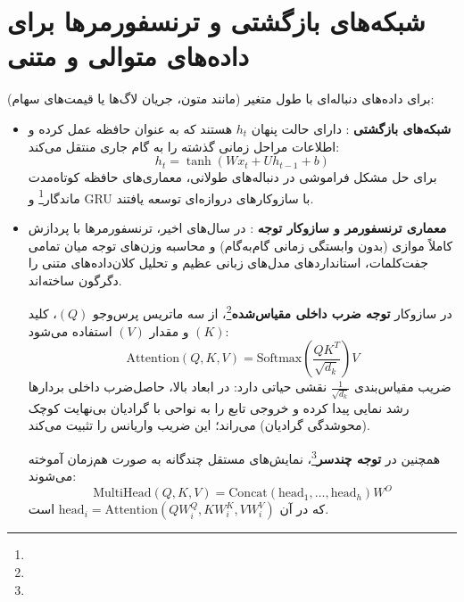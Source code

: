\section{شبکه‌های بازگشتی \texorpdfstring{}{(RNN)} و ترنسفورمرها برای داده‌های متوالی و متنی}
برای داده‌های دنباله‌ای با طول متغیر (مانند متون، جریان لاگ‌ها یا قیمت‌های سهام):
\begin{itemize}
    \item \textbf{شبکه‌های بازگشتی }: دارای حالت پنهان $h_t$ هستند که به عنوان حافظه عمل کرده و اطلاعات مراحل زمانی گذشته را به گام جاری منتقل می‌کند:
    \begin{equation}
    h_t = \tanh(W x_t + U h_{t-1} + b)
    \end{equation}
    برای حل مشکل فراموشی در دنباله‌های طولانی، معماری‌های حافظه کوتاه‌مدت ماندگار\footnote{} و GRU با سازوکارهای دروازه‌ای  توسعه یافتند.
    \item \textbf{معماری ترنسفورمر و سازوکار توجه }: در سال‌های اخیر، ترنسفورمرها با پردازش کاملاً موازی (بدون وابستگی زمانی گام‌به‌گام) و محاسبه وزن‌های توجه میان تمامی جفت‌کلمات، استانداردهای مدل‌های زبانی عظیم  و تحلیل کلان‌داده‌های متنی را دگرگون ساخته‌اند.
    
    در سازوکار \textbf{توجه ضرب داخلی مقیاس‌شده}\footnote{}، از سه ماتریس پرس‌وجو $(Q)$، کلید $(K)$ و مقدار $(V)$ استفاده می‌شود:
    \begin{equation}
    \text{Attention}(Q, K, V) = \text{Softmax}\left( \frac{Q K^T}{\sqrt{d_k}} \right) V
    \end{equation}
    ضریب مقیاس‌بندی $\frac{1}{\sqrt{d_k}}$ نقشی حیاتی دارد: در ابعاد بالا، حاصل‌ضرب داخلی بردارها رشد نمایی پیدا کرده و خروجی تابع  را به نواحی با گرادیان بی‌نهایت کوچک (محوشدگی گرادیان) می‌راند؛ این ضریب واریانس را تثبیت می‌کند.
    
    همچنین در \textbf{توجه چندسر}\footnote{}، نمایش‌های مستقل چندگانه به صورت هم‌زمان آموخته می‌شوند:
    \begin{equation}
    \text{MultiHead}(Q, K, V) = \text{Concat}(\text{head}_1, \dots, \text{head}_h) W^O
    \end{equation}
    که در آن $\text{head}_i = \text{Attention}(Q W_i^Q, K W_i^K, V W_i^V)$ است.
\end{itemize}

